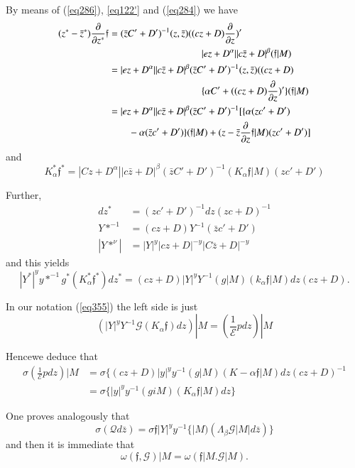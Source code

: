 By means of (\ref{eq286}), \ref{eq122'} and (\ref{eq284}) we have 
 \begin{align*}
(z^* - \bar{z}^*) \frac{\partial}{\partial z^*} \mathfrak{f} & =
   (\bar{z}C' + D' ) ^{-1} (z , \bar{z}) ((c z + D )
   \frac{\partial}{\partial z})'\\
& \hspace{3.3cm} | e z + D^\alpha| |c \bar{z} +
   D|^\beta (\mathfrak{f} | M)\\ 
& = | e z + D^\alpha| |c \bar{z} + D|^\beta (\bar{z}C' + D' ) ^{-1} (z
   , \bar{z}) ((c z + D ) \\
& \hspace{3.3cm} \{ \alpha C' + ((c z + D )
   \frac{\partial}{\partial z})'\} (\mathfrak{f} | M)\\ 
& = | e z + D^\alpha| |c \bar{z} + D|^\beta (\bar{z}C' + D' ) ^{-1} [
     \{ \alpha (z c' + D' )\\
& \qquad  - \alpha (\bar{z} c' + D')\} (\mathfrak{f}
     | M) + (z - \bar{z} \frac{\partial}{\partial z} \mathfrak{f} |M )
     (z c' + D')]  
 \end{align*} 
 and 
$$
K_\alpha^ * \mathfrak{f} ^* = | C z + D^\alpha| |c \bar{z} + D|^\beta
(\bar{z}C' + D' ) ^{-1} (K_\alpha \mathfrak{f}|M) (z c' + D') 
$$

Further, 
\begin{align*}
d z^*  & = (zc' + D' )^{-1}  dz (zc + D )^{-1}\\
Y*^{-1} & = (cz + D )Y^{-1} (\bar{z}c' + D' )\\
| Y*^\nu | & = |Y|^y |c z + D |^{-y} |C \bar{z} + D|^{- y}
\end{align*}
and this yields 
$$
|Y^*|^y y*^{-1} g^* (K^*_\alpha \mathfrak{f}^*) dz^* = (cz + D)
|Y|^y Y^{-1} (g |M)(k_\alpha \mathfrak{f} |M ) dz (cz +D). 
$$

In our notation (\ref{eq355}) the left side is just
$$
(|Y|^y Y^{-1} \mathcal{G}(K_\alpha \mathfrak{f}) dz ) | M =
(\frac{1}{\mathcal{E}} p d z ) |M  
$$

Hence\pageoriginale we deduce that 
\begin{align*}
\sigma (\frac {1}{\mathcal{E}} p d z )|M &= \sigma \{ (c z + D)
|y|^y y^{-1} (g | M ) (K-\alpha \mathfrak{f} | M ) dz (cz +
D)^{-1}\\ 
& = \sigma \{ |y|^y y^{-1} (g i M) (K_\alpha \mathfrak{f} | M ) dz
\} 
\end{align*}

One proves analogously that 
$$
\sigma (\mathcal{Q} d \bar{z}) = \sigma \mathfrak{f} |Y|^y y^{-1}
\{ | M ) (\Lambda_\beta \mathcal{G} |M| d \bar{z}) \} 
$$
and then it is immediate that 
\begin{equation*}
\omega (\mathfrak{f}, \mathcal{G}) | M = \omega (\mathfrak{f} |
M. \mathcal{G} | M ). \tag{336}\label{eq336}   
\end{equation*}

